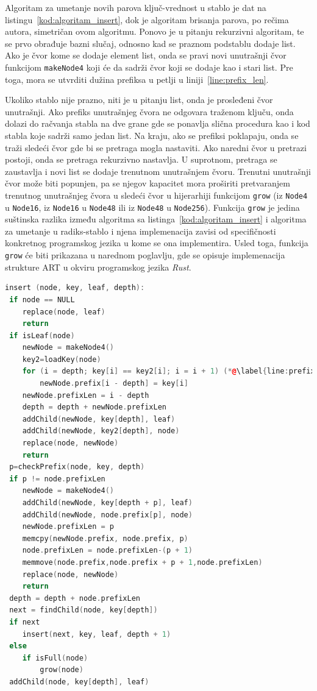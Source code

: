 \documentclass[12pt,oneside]{memoir}
\begin{document}
Algoritam za umetanje novih parova ključ-vrednost u stablo je dat
na listingu~\ref{kod:algoritam_insert}, dok je algoritam brisanja
parova, po rečima autora, simetričan ovom algoritmu. Ponovo je u pitanju
rekurzivni algoritam, te se prvo obrađuje bazni slučaj, odnosno kad
se praznom podstablu dodaje list. Ako je čvor kome se dodaje
element list, onda se pravi novi unutrašnji čvor funkcijom
\texttt{makeNode4} koji će da sadrži čvor koji se dodaje
kao i stari list. Pre toga, mora se utvrditi dužina prefiksa
u petlji u liniji~\ref{line:prefix_len}.

Ukoliko stablo nije prazno, niti je u pitanju list, onda je
prosleđeni čvor unutrašnji. Ako prefiks unutrašnjeg
čvora ne odgovara traženom ključu, onda dolazi do račvanja
stabla na dve grane gde se ponavlja slična procedura
kao i kod stabla koje sadrži samo jedan list. Na kraju, ako se
prefiksi poklapaju, onda se traži sledeći čvor gde bi se
pretraga mogla nastaviti. Ako naredni čvor u pretrazi postoji,
onda se pretraga rekurzivno nastavlja. U suprotnom, pretraga se
zaustavlja i novi list se dodaje trenutnom unutrašnjem čvoru.
Trenutni unutrašnji čvor može biti popunjen, pa se njegov
kapacitet mora proširiti pretvaranjem trenutnog
unutrašnjeg čvora u sledeći čvor u hijerarhiji funkcijom
\texttt{grow} (iz \texttt{Node4}
u \texttt{Node16}, iz \texttt{Node16} u \texttt{Node48} ili
iz \texttt{Node48} u \texttt{Node256}). Funkcija \texttt{grow}
je jedina suštinska razlika između algoritma sa
listinga~\ref{kod:algoritam_insert} i algoritma za umetanje u
radiks-stablo i njena implemenacija zavisi od specifičnosti
konkretnog programskog jezika u kome se ona implementira.
Usled toga, funkcija \texttt{grow} će
biti prikazana u narednom poglavlju, gde se opisuje
implemenacija strukture ART u okviru programskog jezika
\textit{Rust}.

\begin{lstlisting}[language=C++,
                   caption={Algoritam umetanja novih elemenata u stablo},
                   label={kod:algoritam_insert}]
insert (node, key, leaf, depth):
 if node == NULL
    replace(node, leaf)
    return
 if isLeaf(node)
    newNode = makeNode4()
    key2=loadKey(node)
    for (i = depth; key[i] == key2[i]; i = i + 1) (*@\label{line:prefix_len}@*)
        newNode.prefix[i - depth] = key[i]
    newNode.prefixLen = i - depth
    depth = depth + newNode.prefixLen
    addChild(newNode, key[depth], leaf)
    addChild(newNode, key2[depth], node)
    replace(node, newNode)
    return
 p=checkPrefix(node, key, depth)
 if p != node.prefixLen
    newNode = makeNode4()
    addChild(newNode, key[depth + p], leaf)
    addChild(newNode, node.prefix[p], node)
    newNode.prefixLen = p
    memcpy(newNode.prefix, node.prefix, p)
    node.prefixLen = node.prefixLen-(p + 1)
    memmove(node.prefix,node.prefix + p + 1,node.prefixLen)
    replace(node, newNode)
    return
 depth = depth + node.prefixLen
 next = findChild(node, key[depth])
 if next
    insert(next, key, leaf, depth + 1)
 else
    if isFull(node)
        grow(node)
 addChild(node, key[depth], leaf)
\end{lstlisting}
\end{document}
